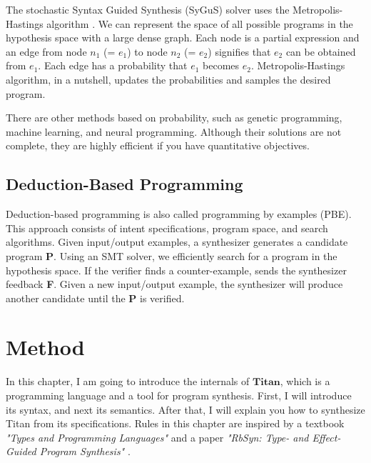 \documentclass[12pt, a4paper, titlepage]{report}
\begin{document}
    The stochastic Syntax Guided Synthesis (SyGuS) solver uses the Metropolis-Hastings algorithm \cite{alur:2013}.
    We can represent the space of all possible programs in the hypothesis space with a large dense graph.
    Each node is a partial expression and an edge from node $n_1$ (= $e_1$) to node $n_2$ (= $e_2$) signifies that $e_2$ can be obtained from $e_1$.
    Each edge has a probability that $e_1$ becomes $e_2$.
    Metropolis-Hastings algorithm, in a nutshell, updates the probabilities and samples the desired program.

    There are other methods based on probability, such as genetic programming, machine learning, and neural programming.
    Although their solutions are not complete, they are highly efficient if you have quantitative objectives.

  \section{Deduction-Based Programming}
    Deduction-based programming is also called programming by examples (PBE).
    This approach consists of intent specifications, program space, and search algorithms.
    Given input/output examples, a synthesizer generates a candidate program \textbf{P}.
    Using an SMT solver, we efficiently search for a program in the hypothesis space.
    If the verifier finds a counter-example, sends the synthesizer feedback \textbf{F}.
    Given a new input/output example, the synthesizer will produce another candidate until the \textbf{P} is verified.



\chapter{Method}\label{chapter:method}
  In this chapter, I am going to introduce the internals of $\mathbf{Titan}$, which is a programming language and a tool for program synthesis.
  First, I will introduce its syntax, and next its semantics.
  After that, I will explain you how to synthesize Titan from its specifications.
  Rules in this chapter are inspired by a textbook \emph{"Types and Programming Languages"} \cite{pierce:2002} and a paper \emph{"RbSyn: Type- and Effect-Guided Program Synthesis"} \cite{guria:2021}.
\end{document}
